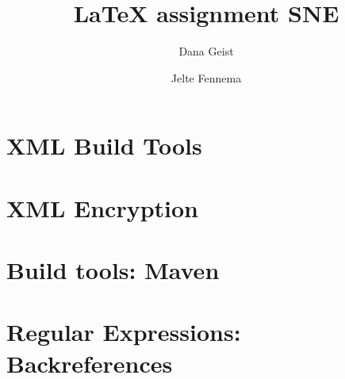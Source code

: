 \documentclass{report}
\title{\LaTeX{} assignment SNE}
\author{Dana Geist \and Jelte Fennema}
\begin{document}
\maketitle
\tableofcontents

\chapter{XML Build Tools}

\chapter{XML Encryption}

\chapter{Build tools: Maven}

\chapter{Regular Expressions: Backreferences}


\printbibliography[heading=bibintoc]{}
\end{document}
